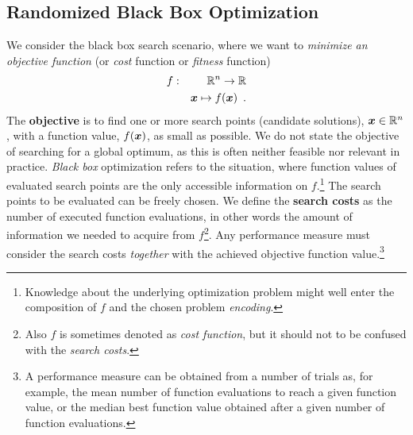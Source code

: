 \documentclass{article} %
\newcommand{\R}{\mathbb{R}}
\newcommand{\ve}[1]{\mathchoice{\mbox{\boldmath$\displaystyle#1$}}
  {\mbox{\boldmath$\textstyle#1$}} {\mbox{\boldmath$\scriptstyle#1$}}
  {\mbox{\boldmath$\scriptscriptstyle#1$}}}
\newcommand{\auge}[1]{\textbf{#1}}
\newcommand{\N}{\ensuremath{n}}
\newcommand{\Rn}{\R^{\N}}
\begin{document}
{\subsection{Randomized Black Box Optimization\label{sec:blackbox}}
We consider the {black box search} scenario, where we want to
\emph{minimize an objective function} (or \emph{cost} function or
\emph{fitness} function)
\begin{eqnarray*} 
f&:& \Rn\to\R \\ && \ve{x}\mapsto f(\ve{x}) \enspace.
\end{eqnarray*}
%
 The \auge{objective} is to find one or more search points (candidate
 solutions), $\ve{x}\in\Rn$, with a function value, $f(\ve{x})$, as
 small as possible.  We do not state the objective of searching for a
 global optimum, as this is often neither feasible nor relevant in
 practice. \emph{Black box} optimization refers to the situation,
 where function values of evaluated search points are the only
 accessible information on $f$.\footnote{%
%
   Knowledge about the underlying optimization problem might well enter the
   composition of $f$ and the chosen problem \emph{encoding}. }
%
 The search points to be evaluated can be freely chosen. We define the
 \auge{search costs} as the number of executed function evaluations,
 in other words the amount of information we needed to acquire from
 $f$\footnote{%
%
   Also $f$ is sometimes denoted as \emph{cost function}, but it should
   not to be confused with the \emph{search costs}.}. %
%
  Any performance measure must consider the search costs \emph{together} with
 the achieved objective function value.\footnote{%
%
  A performance measure can be obtained from a number of trials as,
  for example, the mean number of function evaluations to reach a
  given function value, or the median best function value obtained
  after a given number of function evaluations.}
%

}
\end{document}
